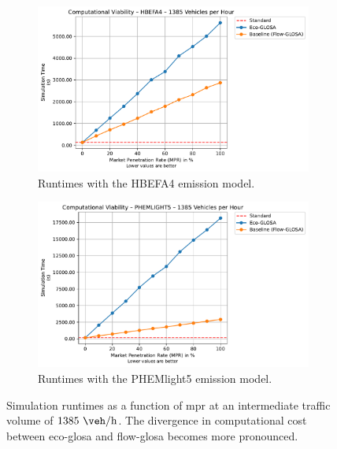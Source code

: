 \begin{figure}[htb]
  \centering
  \begin{subfigure}[b]{0.45\textwidth}
    \includegraphics[width=\textwidth]{data/img/ComputationalViability/ComputationalViability_HBEFA4_Cars1385.pdf}
    \caption{Runtimes with the HBEFA4 emission model.}
    \label{fig:Comp_1385_HBEFA4}
  \end{subfigure}\hfill
  \begin{subfigure}[b]{0.45\textwidth}
    \includegraphics[width=\textwidth]{data/img/ComputationalViability/ComputationalViability_PHEMLIGHT5_Cars1385.pdf}
    \caption{Runtimes with the PHEMlight5 emission model.}
    \label{fig:Comp_1385_PHEM}
  \end{subfigure}
  \caption[Computational Cost at Intermediate Traffic Volume]{Simulation runtimes as a function of \ac{mpr} at an intermediate traffic volume of $1385~\unit{\veh\per\hour}$. The divergence in computational cost between \ac{eco-glosa} and \ac{flow-glosa} becomes more pronounced.}
  \label{fig:Comp_1385}
\end{figure}

